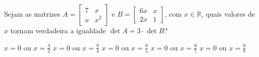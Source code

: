 Sejam as matrizes $A = \left[ \begin{array}{cc}
7 & x \\
x & x^2
\end{array} \right]$ e $B = \left[ \begin{array}{cc}
6x & x \\
2x & 1
\end{array} \right]$, com $x\in\mathbb{R}$, quais valores de $x$ tornam verdadeira a igualdade $\det A=3\cdot\det B$?

$x=0$ ou $x=\frac{3}{2}$
$x=0$ ou $x=\frac{9}{4}$
$x=0$ ou $x=\frac{9}{5}$
$x=0$ ou $x=\frac{9}{7}$
$x=0$ ou $x=\frac{9}{8}$


